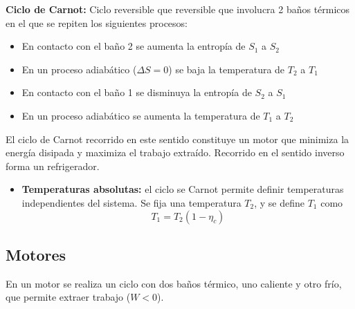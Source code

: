 \textbf{Ciclo de Carnot:} Ciclo reversible que reversible que involucra 2 baños térmicos en el que se repiten los siguientes procesos:

\begin{itemize}
    \item En contacto con el baño 2 se aumenta la entropía de $S_1$ a $S_2$
    \item En un proceso adiabático ($\Delta S=0$) se baja la temperatura de $T_2$ a $T_1$
    \item En contacto con el baño 1 se disminuya la entropía de $S_2$ a $S_1$
    \item En un proceso adiabático se aumenta la temperatura de $T_1$ a $T_2$
\end{itemize}

El ciclo de Carnot recorrido en este sentido constituye un motor que minimiza la energía disipada y maximiza el trabajo extraído. Recorrido en el sentido inverso forma un refrigerador.

\begin{itemize}
    \item \textbf{Temperaturas absolutas:} el ciclo se Carnot permite definir temperaturas independientes del sistema. Se fija una temperatura $T_2$, y se define $T_1$ como
\[T_1 = T_2(1-\eta_c)\]
\end{itemize}

\subsection{Motores}

En un motor se realiza un ciclo con dos baños térmico, uno caliente y otro frío, que permite extraer trabajo ($W<0$).\\

